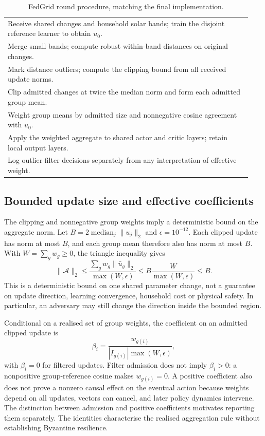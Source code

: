 \documentclass[preprint,12pt,a4paper]{elsarticle}
\begin{document}
\begin{table}[htbp]
\centering
\caption{FedGrid round procedure, matching the final implementation.}
\label{tab:algorithm}
\begin{tabular}{p{0.94\linewidth}}
\toprule
Receive shared changes and household solar bands; train the disjoint reference learner to obtain $u_0$.\\
Merge small bands; compute robust within-band distances on original changes.\\
Mark distance outliers; compute the clipping bound from all received update norms.\\
Clip admitted changes at twice the median norm and form each admitted group mean.\\
Weight group means by admitted size and nonnegative cosine agreement with $u_0$.\\
Apply the weighted aggregate to shared actor and critic layers; retain local output layers.\\
Log outlier-filter decisions separately from any interpretation of effective weight.\\
\bottomrule
\end{tabular}
\end{table}

\subsection{Bounded update size and effective coefficients}
The clipping and nonnegative group weights imply a deterministic bound on the aggregate norm. Let $B=2\operatorname{median}_j\|u_j\|_2$ and $\epsilon=10^{-12}$. Each clipped update has norm at most $B$, and each group mean therefore also has norm at most $B$. With $W=\sum_gw_g\geq0$, the triangle inequality gives
\begin{equation}
\|\mathcal A\|_2\leq\frac{\sum_gw_g\|\bar u_g\|_2}{\max(W,\epsilon)}
\leq B\frac{W}{\max(W,\epsilon)}\leq B.
\end{equation}
This is a deterministic bound on one shared parameter change, not a guarantee on update direction, learning convergence, household cost or physical safety. In particular, an adversary may still change the direction inside the bounded region.

Conditional on a realised set of group weights, the coefficient on an admitted clipped update is
\begin{equation}
\beta_i=\frac{w_{g(i)}}{|I_{g(i)}|\max(W,\epsilon)},
\end{equation}
with $\beta_i=0$ for filtered updates. Filter admission does not imply $\beta_i>0$: a nonpositive group-reference cosine makes $w_{g(i)}=0$. A positive coefficient also does not prove a nonzero causal effect on the eventual action because weights depend on all updates, vectors can cancel, and later policy dynamics intervene. The distinction between admission and positive coefficients motivates reporting them separately. The identities characterise the realised aggregation rule without establishing Byzantine resilience.
\end{document}
